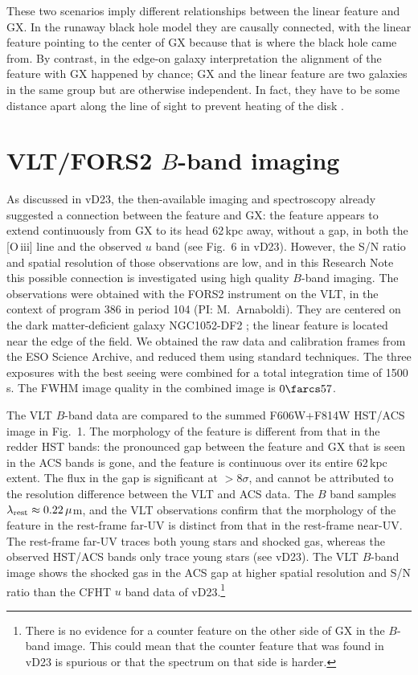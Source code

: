 \documentclass[RNAAS]{aastex62}
\begin{document}
These two scenarios imply different relationships between
the linear feature and GX.
In the runaway black hole model they are causally connected,
with the linear feature pointing to the center of GX because that is where the black hole came from.
By contrast, in the edge-on galaxy interpretation the alignment of the
feature with GX happened by chance; GX and the linear feature
are two galaxies in the same group but are otherwise independent. In fact, they have to be
some distance apart along the line of sight
to prevent heating of the disk \citep[see, e.g.,][]{selwood:14}. 


\section{VLT/FORS2 $B$-band imaging}

As discussed in vD23, the then-available imaging and spectroscopy already suggested a
connection between the feature and GX: the feature appears to extend continuously from
GX to its head 62\,kpc away, without a gap,
in both the  [O\,{\sc iii}] line and the observed $u$ band
(see Fig.\ 6 in vD23).  However, the S/N ratio and spatial resolution of those observations are low,
and in this Research Note this possible connection is
investigated using high quality
$B$-band imaging.  The observations were obtained
with the FORS2 instrument on the VLT, in the context of program 386 in period 104 (PI:
M.\ Arnaboldi). They are centered on the dark matter-deficient galaxy NGC1052-DF2 \citep{vd18};
the linear feature is located near the edge of the field. We obtained the raw data
and calibration frames from the ESO Science Archive, and reduced them using
standard techniques. The three exposures with the best seeing were combined for a total
integration time of 1500\,s. The FWHM image quality in the combined image is $0\farcs 57$. 

The VLT $B$-band data are compared to the summed F606W+F814W HST/ACS image in Fig.\ 1. 
The morphology of the feature is different from that in the redder HST bands:
the pronounced gap between the feature and GX that is seen in the ACS bands is gone,
and the feature is continuous over its entire 62\,kpc extent. The flux in the
gap is significant at $>8\sigma$, and cannot be attributed to the resolution difference
between the VLT and ACS data.
The $B$ band samples $\lambda_{\rm rest}\approx 0.22\,\mu$m, and the VLT observations
confirm that the morphology of the feature in the rest-frame far-UV is distinct from
that in the rest-frame near-UV.
The rest-frame far-UV traces
both young stars and shocked gas, whereas the observed HST/ACS bands only
trace young stars (see vD23).
The VLT $B$-band image shows the shocked gas in the
ACS gap at higher spatial resolution and S/N ratio
than the CFHT $u$ band data of vD23.\footnote{There is
no evidence for a counter feature
on the other side of GX in the $B$-band image.  This could mean that the counter feature
that was found in vD23 is spurious or that the 
spectrum on that side is harder.}
\end{document}
